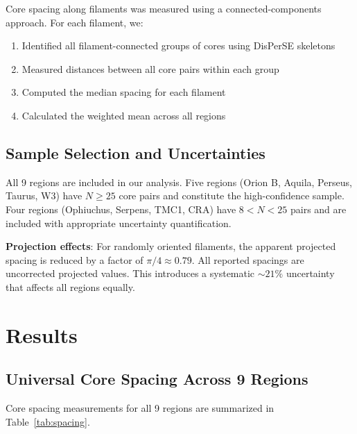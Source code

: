 \documentclass[11pt,a4paper]{article}
\begin{document}
Core spacing along filaments was measured using a connected-components approach. For each filament, we:
\begin{enumerate}
    \item Identified all filament-connected groups of cores using DisPerSE skeletons
    \item Measured distances between all core pairs within each group
    \item Computed the median spacing for each filament
    \item Calculated the weighted mean across all regions
\end{enumerate}

\subsection{Sample Selection and Uncertainties}

All 9 regions are included in our analysis. Five regions (Orion B, Aquila, Perseus, Taurus, W3) have $N \geq 25$ core pairs and constitute the high-confidence sample. Four regions (Ophiuchus, Serpens, TMC1, CRA) have $8 < N < 25$ pairs and are included with appropriate uncertainty quantification.

\textbf{Projection effects}: For randomly oriented filaments, the apparent projected spacing is reduced by a factor of $\pi/4 \approx 0.79$. All reported spacings are uncorrected projected values. This introduces a systematic $\sim21\%$ uncertainty that affects all regions equally.

\section{Results}

\subsection{Universal Core Spacing Across 9 Regions}

Core spacing measurements for all 9 regions are summarized in Table~\ref{tab:spacing}.
\end{document}
